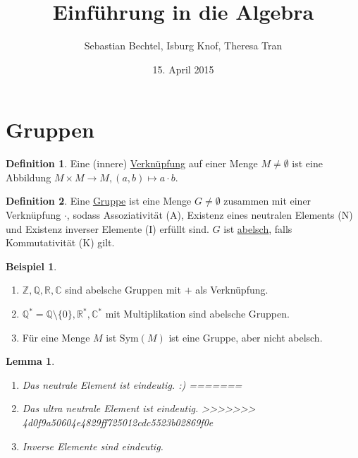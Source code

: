 \documentclass[12pt]{scrartcl}%
\newtheorem{lemma}{Lemma}
\theoremstyle{definition}
\newtheorem*{defn}{Definition}
\newtheorem{ex}{Beispiel}
\theoremstyle{remark}
\newcommand{\sym}{\text{Sym}}
\begin{document}
\author{Sebastian Bechtel, Isburg Knof, Theresa Tran}
\title{Einführung in die Algebra}
\date{15. April 2015}

\maketitle

\section{Gruppen}

\begin{defn}
    Eine (innere) \underline{Verknüpfung} auf einer Menge $M\neq \emptyset$ ist eine Abbildung $M\times M\to M, (a,b)\mapsto a\cdot b$.
\end{defn}

\begin{defn}
    Eine \underline{Gruppe} ist eine Menge $G\neq \emptyset$ zusammen mit einer Verknüpfung $\cdot$, sodass Assoziativität (A), Existenz eines neutralen Elements (N) und Existenz inverser Elemente (I) erfüllt sind. $G$ ist \underline{abelsch}, falls Kommutativität (K) gilt.
\end{defn}

\begin{ex}
    \begin{enumerate}
        \item $\mathbb{Z}, \mathbb{Q}, \mathbb{R}, \mathbb{C}$ sind abelsche Gruppen mit $+$ als Verknüpfung.
        \item $\mathbb{Q}^*=\mathbb{Q}\setminus \{0\}, \mathbb{R}^*, \mathbb{C}^*$ mit Multiplikation sind abelsche Gruppen.
        \item Für eine Menge $M$ ist $\sym(M)$ ist eine Gruppe, aber nicht abelsch.
    \end{enumerate}
\end{ex}

\begin{lemma}
    \begin{enumerate}[label=\alph*)]
<<<<<<< HEAD
        \item Das neutrale Element ist eindeutig. :)
=======
        \item Das ultra neutrale Element ist eindeutig.
>>>>>>> 4d0f9a50604e4829ff725012cdc5523b02869f0e
        \item Inverse Elemente sind eindeutig.
    \end{enumerate}
\end{lemma}
\end{document}
